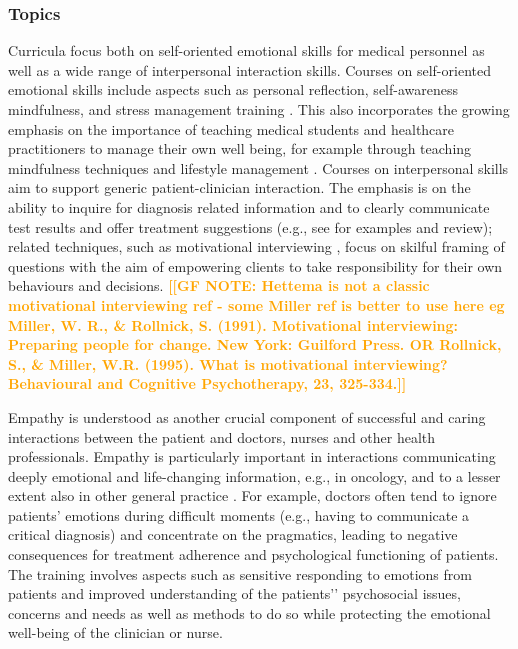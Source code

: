 \documentclass[prodmode,acmtochi]{acmsmall}
\newcommand{\Geraldine}[1]{\textrm{\textbf{\textcolor{Orange}{[[#1]]}}}}
\begin{document}
\subsubsection*{Topics} 
Curricula focus both on self-oriented emotional skills for medical personnel as well as a wide range of interpersonal interaction skills. 
%
Courses on self-oriented emotional skills include aspects such as personal reflection, self-awareness mindfulness, and stress management training \cite{Shapiro2000,Epstein1999,Satterfield2007}. This also incorporates the growing emphasis on the importance of teaching medical students and healthcare practitioners to manage their own well being, for example through teaching mindfulness techniques and lifestyle management \cite{Hassed2009}.
%
Courses on interpersonal skills aim to support generic patient-clinician interaction. The emphasis is on the ability to inquire for diagnosis related information and to clearly communicate test results and offer  treatment suggestions (e.g., see \cite{Kalet2004,Barth2011} for examples and review); related techniques, such as  motivational interviewing \cite{Hettema2005},  focus on skilful framing of questions with the aim of empowering  clients to take responsibility for their own behaviours and decisions.  
\Geraldine{GF NOTE: Hettema is not a classic motivational interviewing ref - some Miller ref is better to use here eg Miller, W. R., & Rollnick, S. (1991). Motivational interviewing: Preparing people for change. New York: Guilford Press. OR Rollnick, S., & Miller, W.R. (1995). What is motivational interviewing? Behavioural and Cognitive Psychotherapy, 23, 325-334.}
%
 
Empathy is understood as another crucial component of successful and caring interactions between the patient and doctors, nurses and other health professionals. Empathy is particularly important in interactions communicating deeply emotional and life-changing information, e.g., in oncology, and to a lesser extent also in other general practice \cite{Barth2011}.
                For example, doctors often tend to ignore patients' emotions during difficult moments (e.g., having to communicate a critical diagnosis) and concentrate on the pragmatics, leading to negative consequences for treatment adherence and psychological functioning of patients. The training involves aspects such as sensitive responding to emotions from patients and improved understanding of the patients'’ psychosocial issues, concerns and needs as well as methods to do so while protecting the emotional well-being of the clinician or nurse. 
\end{document}
